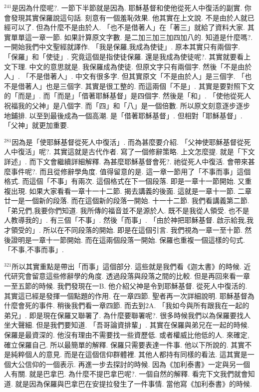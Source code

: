 \documentclass{book}
\begin{document}
$^{241}$是因為什麼呢?.
一節下半節就是因為.
耶穌基督和使他從死人中復活的副實.
你會發現其實保羅說這句話.
刻意有一個羞恥效果.
他其實在上文說.
不是由於人就已經可以了.
但為什麼不是由於人.
「也不是借著人」在「著三」就給了資料大家.
其實單單這一章一節.
如果計算原文字數.
是二加三加三加四加八的.
知道是什麼嗎?.
一開始我們中文聖經就譯作.
「我是保羅,我成為使徒」.
原本其實只有兩個字.
「保羅」和「使徒」.
究竟這個是指使徒保羅.
還是我成為使徒呢?.
其實就要看上文下理.
中文的意思就是.
我保羅成為使徒.
但原文字只有兩個字.
然後「不是由於人」.
「不是借著人」.
中文有很多字.
但其實原文「不是由於人」是三個字.
「也不是借著人」也是三個字.
其實是很工整的.
而這兩個「不是」.
其實是要對照下文的「而是」.
而「而是」「借著耶穌基督」是四個字.
然後是「和」.
「使他從死人祝福我的父神」是八個字.
而「四」和「八」是一個倍數.
所以原文刻意逐步逐步地鋪排.
以至到最後成為一個高潮.
是「借著耶穌基督」.
但相對「耶穌基督」.
「父神」就更加重要.

$^{281}$因為是「使耶穌基督從死人中復活」.
而為甚麼要介紹.
「父神使耶穌基督從死人中復活」呢?.
其實這就是古代作者.
寫了一個修辭策略.
上文怎麼提.
就是「下文詳述」.
而下文會繼續詳細解釋.
為甚麼耶穌基督會死?.
祂從死人中復活.
會帶來甚麼事件呢?.
而且從修辭學角度.
值得留意的是.
這一章一節用了「不事而事」這個格式.
而這個「不事」有兩次.
這個格式在下一個段落.
即是一章十一節開始.
又重複出現.
如果大家看看一章十一十二節.
揭去講義的後面.
這就是一章十一節.
二章廿一是一個新的段落.
而在這個新的段落一開始.
十一十二節.
我們看講義第二節.
「弟兄們,我要你們知道.
我所傳的福音並不是源於人.
既不是我從人領受.
也不是人教導我的」.
有三個「不事」.
然後「而事」.
「由於神把耶穌基督.
啟示給我,我才領受的」.
所以在不同段落的開始.
即是在這個引言.
我們視為一章一至十節.
然後證明是一章十一節開始.
而在這兩個段落一開始.
保羅也重複一個這樣的句式.
「不事,不事而事」.

$^{321}$所以其實重點是帶出「而事」這個部分.
這些就是我們看《迦太書》的時候.
近代研究會留意這些修辭學的角度.
透過段落與段落之間的比較.
但是再回來看一章一至五節的時候.
我們發現在一B.
他介紹父神是令到耶穌基督.
從死人中復活的.
其實這已經是發揮一個點題的作用.
在一章四節.
聖者再一次詳細說明.
耶穌基督為什麼會死的事件.
稍後我們看一章四節.
而去到2A.
「我如今與所有跟我在一起的弟兄」.
即是現在保羅又聯署了.
為什麼要聯署呢?.
很多時候我們以為保羅要找人坐大聲細.
但是我們要知道.
「吾哥論資排輩」.
其實在保羅與弟兄在一起的時候.
保羅是最資深的.
他沒有理由不需要找一些資歷低.
或者權威比他低的人.
來確定,確立保羅自己.
所以最簡單的解釋.
保羅只需要表達一件事.
他以下所說的.
其實不是純粹個人的意見.
而是在這個信仰群體裡.
其他人都持有同樣的看法.
這其實是一個大公信仰的一個表示.
再進一步去探討的時候.
因為《加利泰書》一定與另一個人有關.
就是巴拿巴.
為什麼不提巴拿巴呢?.
一個自然的解釋.
看完下文我們就會知道.
就是因為保羅與巴拿巴在安提拉發生了一件事情.
當他寫《加利泰書》的時候.
\end{document}
